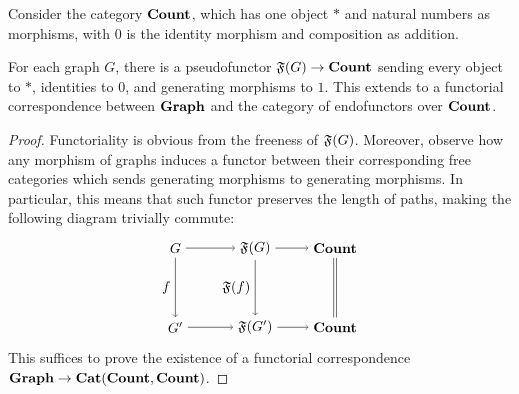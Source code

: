 %
%
\begingroup
\def\thetheoremUnified{\ref{thm: path functor}}
\begin{lemma}
  Consider the category $\textbf{Count}$, which has one object $*$ and 
  natural numbers as morphisms, with $0$ is the identity morphism 
  and composition as addition. 

  For each graph $G$, there is a pseudofunctor $\mathfrak{F}(G) \to \textbf{Count}$ sending 
  every object to  $*$, identities to $0$, and generating morphisms to $1$.
  This extends to a functorial correspondence between $\textbf{Graph}$ and the 
  category of endofunctors over $\textbf{Count}$.
\end{lemma}
\addtocounter{theoremUnified}{-1}
\endgroup
\begin{proof}
  Functoriality is obvious from the freeness of $\mathfrak{F}(G)$.
  Moreover, observe how any morphism of graphs induces a functor between 
  their corresponding free categories which sends generating morphisms 
  to generating morphisms. In particular, this means that such 
  functor preserves the length of paths, making the following diagram 
  trivially commute:
  \begin{equation*}
    \begin{tikzpicture}
      \node (G') at (-2,0) {$G'$}; 
      \node (G) at (-2,2) {$G$};
      \node (FG') at (0,0) {$\Free{G'}$}; 
      \node (FG) at (0,2) {$\Free{G}$};
      \node (Count') at (2,0) {$\Count$};
      \node (Count) at (2,2) {$\Count$};
      \draw[->] (G) -- node[left] {$f$} (G');
      \draw[->] (G) -- (FG);
      \draw[->] (G') -- (FG');
      \draw[->] (FG) -- node[left] {$\Free{f}$} (FG');
      \draw[->] (FG) -- (Count);
      \draw[->] (FG') -- (Count');
      \draw[transform canvas={xshift=-1pt}, -] (Count) -- (Count');
      \draw[transform canvas={xshift=1pt}, -] (Count) -- (Count');
    \end{tikzpicture}
  \end{equation*}
  This suffices to prove the existence of a functorial correspondence $\textbf{Graph} \to \textbf{Cat}(\textbf{Count}, \textbf{Count})$.
\end{proof}
%
%
\begingroup
\def\thetheoremUnified{\ref{thm: graph functor}}
